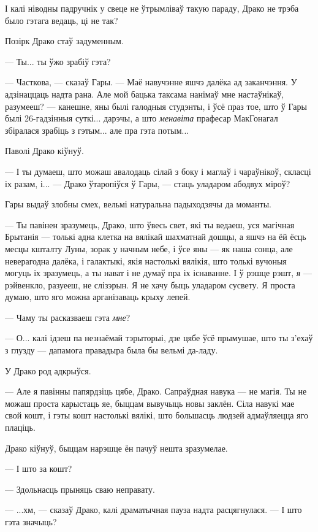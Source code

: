І калі ніводны падручнік у свеце не ўтрымліваў такую параду, Драко не трэба было 
гэтага ведаць, ці не так?

Позірк Драко стаў задуменным.

--- Ты... ты ўжо зрабіў гэта?

--- Часткова, --- сказаў Гары. --- Маё навучэнне яшчэ далёка ад заканчэння. У адзінаццаць
надта рана. Але мой бацька таксама нанімаў мне настаўнікаў, разумееш? --- канешне, 
яны былі галодныя студэнты, і ўсё праз тое, што ў Гары былі 26-гадзінныя суткі...
дарэчы, а што \emph{менавіта} прафесар МакГонагал збіралася зрабіць з гэтым...
але пра гэта потым... 

Паволі Драко кіўнуў. 

--- І ты думаеш, што можаш авалодаць сілай з боку і маглаў і чараўнікоў, скласці іх разам, і... ---
Драко ўтаропіўся ў Гары, --- стаць уладаром абодвух міроў?

Гары выдаў злобны смех, вельмі натуральна падыходзячы да моманты.

--- Ты павінен зразумець, Драко, што ўвесь свет, які ты ведаеш, уся магічная Брытанія ---
толькі адна клетка на вялікай шахматнай дошцы, а яшчэ на ёй ёсць месцы кшталту Луны,
зорак у начным небе, і ўсе яны --- як наша сонца, але неверагодна далёка, і галактыкі,
якія настолькі вялікія, што толькі вучоныя могуць іх зразумець, а ты нават і не думаў 
пра іх існаванне. І ў рэшце рэшт, \emph{я} --- рэйвенкло, разуееш, не слізэрын.
Я не хачу быць уладаром сусвету. Я проста думаю, што яго можна арганізаваць крыху
лепей.

--- Чаму ты расказваеш гэта \emph{мне}?

--- О... калі ідзеш па незнаёмай тэрыторыі, дзе цябе ўсё прымушае, што ты з'ехаў 
з глузду --- дапамога правадыра была бы вельмі да-ладу.  

У Драко род адкрыўся.

--- Але я павінны папярдзіць цябе, Драко. Сапраўдная навука --- не магія. Ты не можаш
проста карыстаць яе, быццам вывучыць новы заклён. Сіла навукі мае свой кошт, 
і гэты кошт настолькі вялікі, што большасць людзей адмаўляецца яго плаціць.

Драко кіўнуў, быццам нарэшце ён пачуў нешта зразумелае.

--- І што за кошт?

--- Здольнасць прыняць сваю неправату.



--- ...хм, --- сказаў Драко, калі драматычная пауза надта расцягнулася. --- І што гэта значыць?


